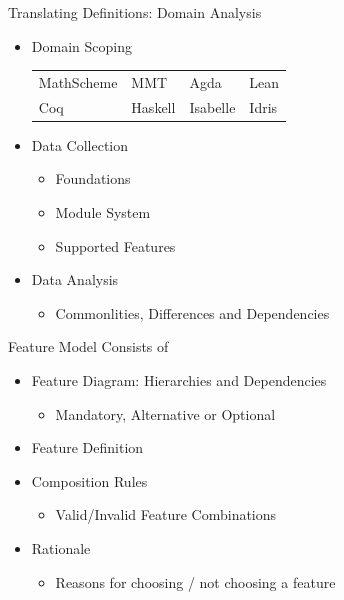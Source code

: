 \documentclass[t,12pt,numbers,fleqn,usenames,xcolor=dvipsnames]{beamer}
\begin{document}
\begin{frame}[fragile]{Translating Definitions: Domain Analysis}
\begin{itemize}
	\item Domain Scoping 
\scriptsize{	
	\begin{tabular}{ p{1cm} p{1cm} p{1cm} p{1cm}}
		MathScheme & MMT & Agda & Lean \\ [1ex]
		Coq & Haskell &  Isabelle & Idris 
	\end{tabular}}
\normalsize
	\item Data Collection 
	\begin{itemize}
		\item Foundations 
		\item Module System 
		\item Supported Features 
	\end{itemize}
	\item Data Analysis 
	\begin{itemize}
		\item Commonlities, Differences and Dependencies 
	\end{itemize}
\end{itemize}
\end{frame}

\begin{frame}[fragile]{Feature Model}
Consists of 
\begin{itemize}
	\item Feature Diagram: Hierarchies and Dependencies
	\begin{itemize}
		\item Mandatory, Alternative or Optional 
	\end{itemize}
	\item Feature Definition
	\item Composition Rules
	\begin{itemize}
		\item Valid/Invalid Feature Combinations 
	\end{itemize}
	\item Rationale
	\begin{itemize}
		\item Reasons for choosing / not choosing a feature
	\end{itemize} 
\end{itemize}
\end{frame}
\end{document}
